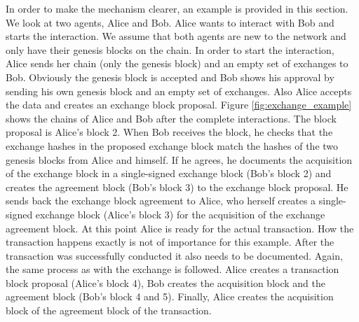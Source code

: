 In order to make the mechanism clearer, an example is provided in this section. We look at two
agents, Alice and Bob. Alice wants to interact with Bob and starts the interaction. We assume that
both agents are new to the network and only have their genesis blocks on the chain. In order to
start the interaction, Alice sends her chain (only the genesis block) and an empty set of exchanges
to Bob. Obviously the genesis block is accepted and Bob shows his approval by sending his own
genesis block and an empty set of exchanges. Also Alice accepts the data and creates an exchange 
block proposal. Figure \ref{fig:exchange_example} shows the chains of Alice and Bob after the 
complete interactions. The block proposal is Alice's block 2. When Bob receives the block, he checks
that the exchange hashes in the proposed exchange block match the hashes of the two genesis blocks 
from Alice and himself. If he agrees, he documents the acquisition of the exchange block in a
single-signed exchange block (Bob's block 2) and creates the agreement block (Bob's block 3) to the exchange block proposal. He 
sends back the exchange block agreement to Alice, who herself creates a single-signed exchange block
(Alice's block 3) for the acquisition of the exchange agreement block. At this point Alice is ready for the actual 
transaction. How the transaction happens exactly is not of importance for this example. After the transaction was successfully conducted it also needs to be documented. Again,
the same process as with the exchange is followed. Alice creates a transaction block proposal (Alice's block 4), Bob
creates the acquisition block and the agreement block (Bob's block 4 and 5). Finally, Alice creates the acquisition block of the agreement block of the transaction.

